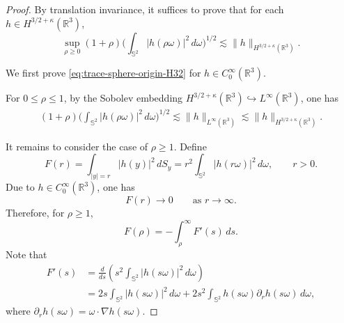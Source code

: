 \documentclass[11pt,twoside]{article}
\theoremstyle{plain}
\theoremstyle{definition}
\theoremstyle{assumption}
\numberwithin{equation}{section}
\begin{document}
	\begin{proof}
		By translation invariance, it suffices to prove that for each
		$h\in H^{3/2+\kappa}(\mathbb R^3)$,
		\begin{equation}\label{eq:trace-sphere-origin-H32}
			\sup_{\rho\ge0}
			(1+\rho)
			\big(
			\int_{\mathbb S^2}|h(\rho\omega)|^2\,d\omega
			\big)^{1/2}
			\lesssim
			\|h\|_{H^{3/2+\kappa}(\mathbb R^3)} .
		\end{equation}
		
		
		We first prove \eqref{eq:trace-sphere-origin-H32} for
		$h\in C_0^\infty(\mathbb R^3)$.
		
		For $0\le\rho\le1$, by the Sobolev embedding
		$H^{3/2+\kappa}(\mathbb R^3)\hookrightarrow L^\infty(\mathbb R^3)$,
		one has
		\begin{equation*}
			\begin{aligned}
				(1+\rho)
				\big(
				\int_{\mathbb S^2}|h(\rho\omega)|^2\,d\omega
				\big)^{1/2}
				\lesssim
				\|h\|_{L^\infty(\mathbb R^3)}
				\lesssim
				\|h\|_{H^{3/2+\kappa}(\mathbb R^3)} .
			\end{aligned}
		\end{equation*}
		
		It remains to consider the case of $\rho\ge1$. Define
		\begin{equation*}
			F(r)
			=
			\int_{|y|=r}|h(y)|^2\,dS_y
			=
			r^2\int_{\mathbb S^2}|h(r\omega)|^2\,d\omega,
			\qquad r>0.
		\end{equation*}
		Due to $h\in C_0^\infty(\mathbb R^3)$, one has
		\begin{equation*}
			F(r)\to0
			\qquad \text{as } r\to\infty .
		\end{equation*}
		Therefore, for $\rho\ge1$,
		\begin{equation}\label{eq:F-rho-integral-H32}
			F(\rho)
			=-\int_\rho^\infty F'(s)\,ds.
		\end{equation}
		Note that
		\begin{equation}\label{eq:F-derivative-H32}
			\begin{aligned}
				F'(s)
				&=
				\frac{d}{ds}
				\left(
				s^2\int_{\mathbb S^2}|h(s\omega)|^2\,d\omega
				\right)
				\\
				&=
				2s\int_{\mathbb S^2}|h(s\omega)|^2\,d\omega
				+
				2s^2
				\int_{\mathbb S^2}
				h(s\omega)\partial_r h(s\omega)\,d\omega,
			\end{aligned}
		\end{equation}
		where $\partial_r h(s\omega)=\omega\cdot\nabla h(s\omega)$.
		

\end{proof}
\end{document}
